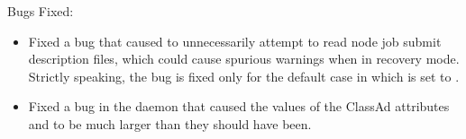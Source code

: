 \noindent Bugs Fixed:

\begin{itemize}

\item Fixed a bug that caused  to unnecessarily attempt
to read node job submit description files, 
which could cause spurious warnings when in recovery mode.
Strictly speaking, the bug is fixed only for the
default case in which  is set
to .

\item Fixed a bug in the  daemon that caused the values
of the ClassAd attributes  and 
 to be much larger than they should have been.

\end{itemize}

